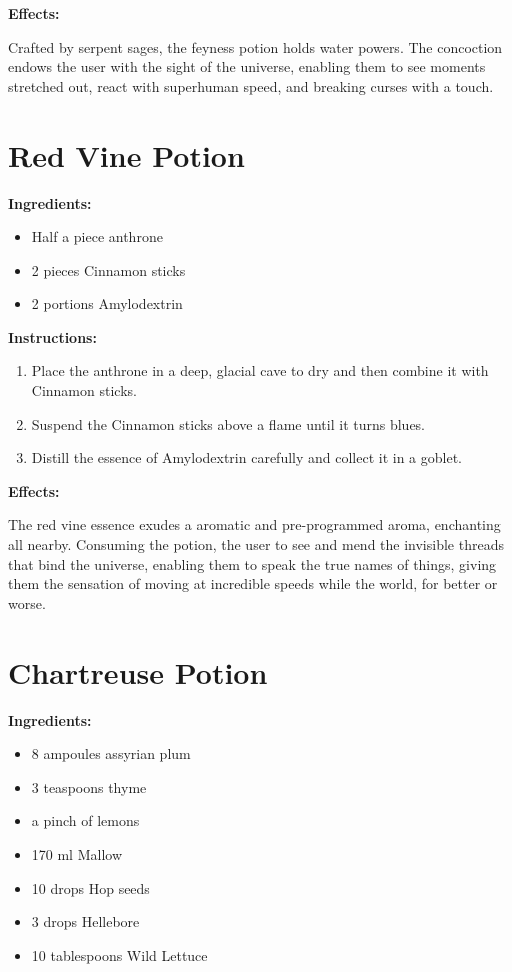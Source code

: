 \documentclass{article}
\begin{document}
\textbf{Effects:}

Crafted by serpent sages, the feyness potion holds water powers. The concoction endows the user with the sight of the universe, enabling them to see moments stretched out, react with superhuman speed, and breaking curses with a touch.

\newpage
\section*{Red Vine Potion}

\textbf{Ingredients:}

\begin{itemize}
  \item Half a piece anthrone
  \item 2 pieces Cinnamon sticks
  \item 2 portions Amylodextrin
\end{itemize}

\textbf{Instructions:}

\begin{enumerate}
  \item Place the anthrone in a deep, glacial cave to dry and then combine it with Cinnamon sticks.
  \item Suspend the Cinnamon sticks above a flame until it turns blues.
  \item Distill the essence of Amylodextrin carefully and collect it in a goblet.
\end{enumerate}

\textbf{Effects:}

The red vine essence exudes a aromatic and pre-programmed aroma, enchanting all nearby. Consuming the potion, the user to see and mend the invisible threads that bind the universe, enabling them to speak the true names of things, giving them the sensation of moving at incredible speeds while the world, for better or worse.

\newpage
\section*{Chartreuse Potion}

\textbf{Ingredients:}

\begin{itemize}
  \item 8 ampoules assyrian plum
  \item 3 teaspoons thyme
  \item a pinch of lemons
  \item 170 ml Mallow
  \item 10 drops Hop seeds
  \item 3 drops Hellebore
  \item 10 tablespoons Wild Lettuce
\end{itemize}
\end{document}

